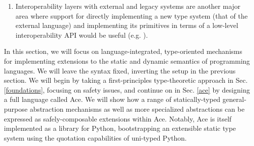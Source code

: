 \begin{enumerate}
\item Interoperability layers with external and legacy systems are another major area where support for directly implementing a new type system (that of the external language) and implementing its primitives in terms of a low-level interoperability API would be useful (e.g. \cite{CinJava}).
\end{enumerate}

In this section, we will focus on language-integrated, type-oriented mechanisms for implementing extensions to the static and dynamic semantics of programming languages. We will leave the syntax fixed, inverting the setup in the previous section. We will begin by taking a  first-principles type-theoretic approach in Sec. \ref{foundations}, focusing on safety issues, and continue on in Sec. \ref{ace} by designing a full language called Ace. We will show how a range of statically-typed general-purpose abstraction mechanisms as well as more specialized abstractions can be expressed as safely-composable extensions within Ace. Notably, Ace is itself implemented as a library for Python, bootstrapping an extensible static type system using the quotation capabilities of uni-typed Python.


